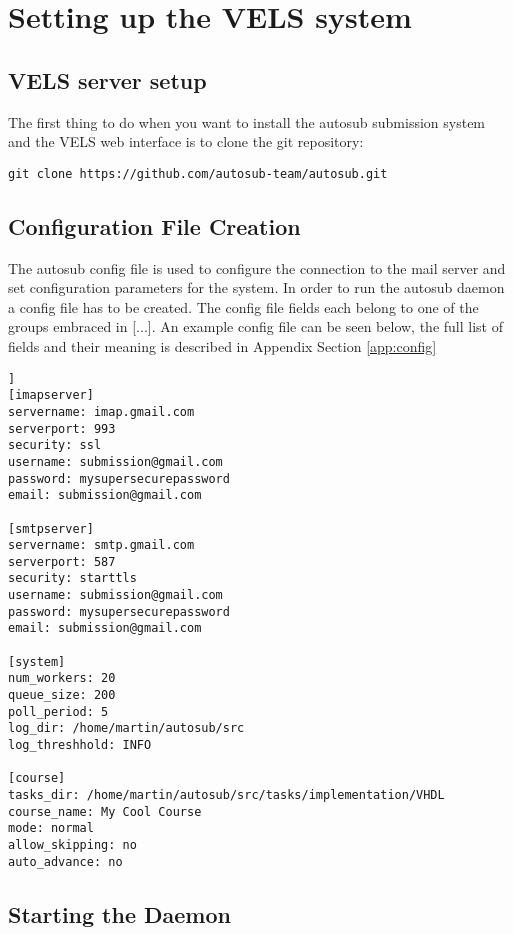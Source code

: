 \section{Setting up the VELS system} \label{system_setup}

\subsection{VELS server setup} \label{sub:serversetup}

The first thing to do when you want to install the autosub submission system and the VELS
web interface is to clone the git repository:

\begin{verbatim}
git clone https://github.com/autosub-team/autosub.git
\end{verbatim}

\subsection{Configuration File Creation} \label{sub:exampleconfig}
The autosub config file is used to configure the connection to the mail server and set
configuration parameters for the system. In order to run the autosub daemon a config file
has to be created. The config file fields each belong to one of the groups embraced 
in [...]. An example config file can be seen below, the full list of fields and their
meaning is described in Appendix 
Section \ref{app:config}

\begin{lstlisting}[frame=single,captionpos=b,caption=example.cfg, belowcaptionskip=4pt]]
[imapserver]
servername: imap.gmail.com
serverport: 993
security: ssl
username: submission@gmail.com
password: mysupersecurepassword
email: submission@gmail.com

[smtpserver]
servername: smtp.gmail.com
serverport: 587
security: starttls
username: submission@gmail.com
password: mysupersecurepassword
email: submission@gmail.com

[system]
num_workers: 20
queue_size: 200
poll_period: 5
log_dir: /home/martin/autosub/src
log_threshhold: INFO

[course]
tasks_dir: /home/martin/autosub/src/tasks/implementation/VHDL
course_name: My Cool Course
mode: normal
allow_skipping: no
auto_advance: no
\end{lstlisting}

\subsection{Starting the Daemon}

